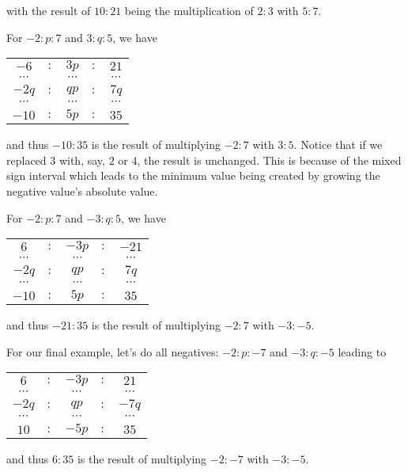 \documentclass[12pt]{article}
\begin{document}
\begin{enumerate}
    with the result of $10:21$ being the multiplication of $2:3$ with $5:7$.
    
    For $-2 : p : 7$ and $3: q : 5$, we have
    
     \begin{tabular}{ccccc}
        $-6$ &$:$& $3p$ &$:$& $21$ \\
        $\cdots$ & & $\cdots$ & & $\cdots$ \\
        $-2q$ &$:$& $qp$ &$:$& $7q$\\
        $\cdots$ & & $\cdots$ & & $\cdots$ \\
         $-10$ &$:$& $5p$&$:$& $35$
    \end{tabular}
    
    and thus $-10:35$ is the result of multiplying $-2:7$ with $3:5$. Notice that if we replaced $3$ with, say, $2$ or $4$, the result is unchanged. This is because of the mixed sign interval which leads to the minimum value being created by growing the negative value's absolute value. 

     For $-2 : p : 7$ and $-3: q : 5$, we have
    
     \begin{tabular}{ccccc}
        $6$ &$:$& $-3p$ &$:$& $-21$ \\
        $\cdots$ & & $\cdots$ & & $\cdots$ \\
        $-2q$ &$:$& $qp$ &$:$& $7q$\\
        $\cdots$ & & $\cdots$ & & $\cdots$ \\
         $-10$ &$:$& $5p$&$:$& $35$
    \end{tabular}
    
    and thus $-21:35$ is the result of multiplying $-2:7$ with $-3:-5$.

    For our final example, let's do all negatives: $-2 : p : -7$ and $-3: q : -5$ leading to
    
     \begin{tabular}{ccccc}
        $6$ &$:$& $-3p$ &$:$& $21$ \\
        $\cdots$ & & $\cdots$ & & $\cdots$ \\
        $-2q$ &$:$& $qp$ &$:$& $-7q$\\
        $\cdots$ & & $\cdots$ & & $\cdots$ \\
         $10$ &$:$& $-5p$&$:$& $35$
    \end{tabular}
    
    and thus $6:35$ is the result of multiplying $-2:-7$ with $-3:-5$.
    

\end{enumerate}
\end{document}
